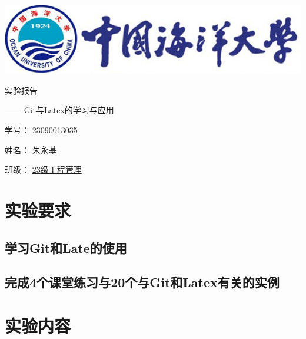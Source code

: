 \documentclass[UTF8,a4paper]{ctexart}
\begin{document}
\begin{sloppypar}


	\begin{center}
	\includegraphics[width = 14cm]{picture/s1}

		\begin{fontsize}{60pt}{20pt}
			实验报告
		\end{fontsize}

		\bigskip
		\bigskip
		
		\begin{fontsize}{20pt}{20pt}
			\begin{flushright}
				—— {\Huge Git}与{\Huge Latex}的学习与应用
			\end{flushright}
		\end{fontsize}
		
		\bigskip
		\bigskip
		\bigskip
		\bigskip
		\bigskip
		\bigskip
		\bigskip
		\bigskip
		\bigskip
		\bigskip
		\bigskip
		\bigskip
		\bigskip
		\bigskip
		\bigskip
		\bigskip
		
		\begin{fontsize}{25pt}{20pt}

			学号：
			\underline{{\huge 23090013035}}
			\bigskip
			\bigskip
			\bigskip
			\bigskip

			姓名：
			\underline{朱永基}
			\bigskip
			\bigskip
			\bigskip
			\bigskip

			班级：
			\underline{{\Huge 23}级工程管理}
				
		\end{fontsize}
	\end{center}
	\section{实验要求}
	\subsection{学习Git和Late的使用}
	\subsection{完成4个课堂练习与20个与Git和Latex有关的实例}

	\section{实验内容}

\end{sloppypar}
\end{document}
